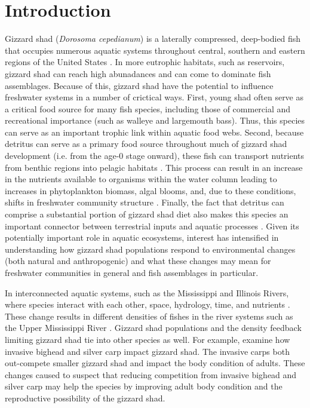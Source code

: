 \documentclass[preprint,review,12pt,authoryear]{elsarticle}
\begin{document}
\section{Introduction}
Gizzard shad (\emph{Dorosoma cepedianum}) is a laterally compressed, deep-bodied fish that occupies numerous aquatic systems throughout central, southern and eastern regions of the United States \citep{pierce1981aspects,vanni2005linking}.  In more eutrophic habitats, such as reservoirs, gizzard shad can reach high abunadances and can come to dominate fish assemblages. Because of this, gizzard shad have the potential to influence freshwater systems in a number of crictical ways. 
First, young shad often serve as a critical food source for many fish species, including those of commercial and recreational importance (such as walleye and largemouth bass)\citep{jester1972life}. Thus, this species can serve as an important trophic link within aquatic food webs.
Second, because detritus can serve as a primary food source throughout much of gizzard shad development (i.e. from the age-0 stage onward), these fish can transport nutrients
from benthic regions into pelagic habitats \citep{mather1995regeneration, schaus2000effects, vanni2005linking}. 
This process can result in an increase in the nutrients available to organisms within the water column leading to increases in phytoplankton biomass, algal blooms, and, due to these conditions, shifts in freshwater community structure \citep{aday2003direct, schaus2000effects}. 
Finally, the fact that detritus can comprise a substantial portion of gizzard shad diet also makes this species an important connector between terrestrial inputs and aquatic processes \citep{schaus2000effects}.
Given its potentially important role in aquatic ecosystems, interest has intensified in understanding how gizzard shad populations respond to environmental changes (both natural and anthropogenic) and what these changes may mean for freshwater communities in general and fish assemblages in particular.

In interconnected aquatic systems, such as the Mississippi and Illinois Rivers, where species interact with each other, space, hydrology, time, and nutrients \citep{thorp2006riverine}. 
These change results in different densities of fishes in the river systems such as the Upper Mississippi River \citep{holland1986distribution}.
Gizzard shad populations and the density feedback limiting gizzard shad tie into other species as well.
For example, \citet{love2018does} examine how invasive bighead and silver carp impact gizzard shad.
The invasive carps both out-compete smaller gizzard shad and impact the body condition of adults.
These changes caused \citet{love2018does} to suspect that reducing competition from invasive bighead and silver carp may help the species by improving adult body condition and the reproductive possibility of the gizzard shad.
\end{document}
